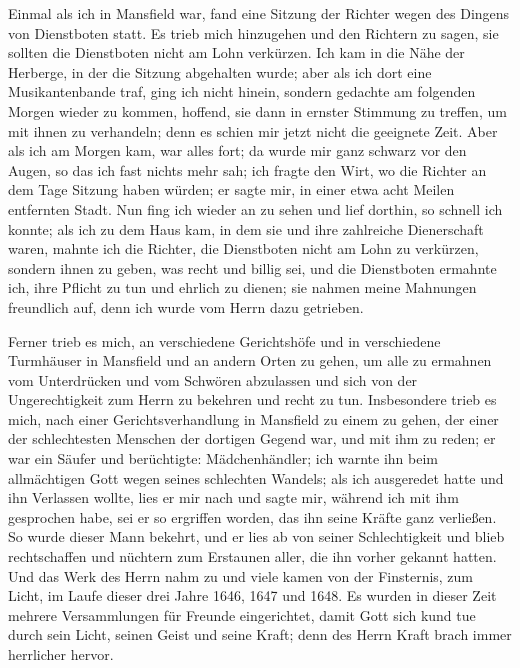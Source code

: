 Einmal als ich in Mansfield war, fand eine Sitzung der
Richter wegen des Dingens von Dienstboten statt. Es trieb
mich hinzugehen und den Richtern zu sagen, sie sollten die
Dienstboten nicht am Lohn verkürzen. Ich kam in die Nähe
der Herberge, in der die Sitzung abgehalten wurde; aber
als ich dort eine Musikantenbande traf, ging ich nicht hinein,
sondern gedachte am folgenden Morgen wieder zu kommen, hoffend,
sie dann in ernster Stimmung zu treffen, um mit ihnen zu 
verhandeln; denn es schien mir jetzt nicht die geeignete Zeit. Aber
als ich am Morgen kam, war alles fort; da wurde mir ganz
schwarz vor den Augen, so das ich fast nichts mehr sah; ich fragte
den Wirt, wo die Richter an dem Tage Sitzung haben würden;
er sagte mir, in einer etwa acht Meilen entfernten Stadt. Nun
fing ich wieder an zu sehen und lief dorthin, so schnell ich konnte;
als ich zu dem Haus kam, in dem sie und ihre zahlreiche 
Dienerschaft waren, mahnte ich die Richter, die Dienstboten nicht am
Lohn zu verkürzen, sondern ihnen zu geben, was recht und billig
sei, und die Dienstboten ermahnte ich, ihre Pflicht zu tun und
ehrlich zu dienen; sie nahmen meine Mahnungen freundlich auf,
denn ich wurde vom Herrn dazu getrieben.

Ferner trieb es mich, an verschiedene Gerichtshöfe und in 
verschiedene Turmhäuser in Mansfield und an andern Orten zu gehen,
um alle zu ermahnen vom Unterdrücken und vom Schwören 
abzulassen und sich von der Ungerechtigkeit zum Herrn zu bekehren und
recht zu tun. Insbesondere trieb es mich, nach einer 
Gerichtsverhandlung in Mansfield zu einem zu gehen, der einer der 
schlechtesten Menschen der dortigen Gegend war, und mit ihm zu reden;
er war ein Säufer und berüchtigte: Mädchenhändler; 
ich warnte ihn
beim allmächtigen Gott wegen seines schlechten Wandels; als ich 
ausgeredet hatte und ihn Verlassen wollte, lies er mir nach und sagte
mir, während ich mit ihm gesprochen habe, sei er so ergriffen worden,
das ihn seine Kräfte ganz verließen. So wurde dieser Mann bekehrt, 
und er lies ab von seiner Schlechtigkeit und blieb rechtschaffen
und nüchtern zum Erstaunen aller, die ihn vorher gekannt hatten.
Und das Werk des Herrn nahm zu und viele kamen von der Finsternis,
zum Licht, im Laufe dieser drei Jahre 1646, 
1647 und 1648.
Es wurden in dieser Zeit mehrere Versammlungen für Freunde 
eingerichtet, damit Gott sich kund tue durch sein Licht, seinen Geist
und seine Kraft; denn des Herrn  Kraft brach immer herrlicher hervor.

